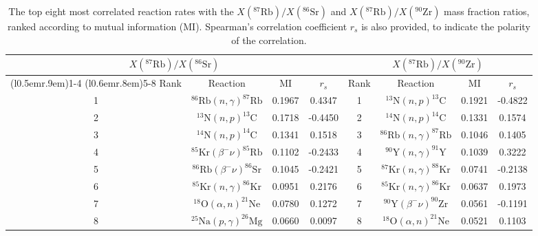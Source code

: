 \begin{table}[t]
\centering
\caption{\label{tab:mutual_info}The top eight most correlated reaction rates with the $X(^{87}\mathrm{Rb})/X(^{86}\mathrm{Sr})$ and $X(^{87}\mathrm{Rb})/X(^{90}\mathrm{Zr})$ mass fraction ratios, ranked according to mutual information (MI). Spearman's correlation coefficient $r_{s}$ is also provided, to indicate the polarity of the correlation.}
\begin{tabular}{cccc|cccc}
\hline\midrule
\multicolumn{4}{c}{$X(^{87}\mathrm{Rb})/X(^{86}\mathrm{Sr})$}&
\multicolumn{4}{c}{$X(^{87}\mathrm{Rb})/X(^{90}\mathrm{Zr})$}\\
\cmidrule[0.05pt](l{0.5em}r{.9em}){1-4} \cmidrule[0.1pt](l{0.6em}r{.8em}){5-8}
Rank&Reaction&MI&$r_{s}$&Rank&Reaction&MI&$r_{s}$\\ \midrule
1&$^{86}\mathrm{Rb}(n,\gamma)^{87}\mathrm{Rb}$&0.1967&0.4347
&1&$^{13}\mathrm{N}(n,p)^{13}\mathrm{C}$&0.1921&-0.4822\\
2&$^{13}\mathrm{N}(n,p)^{13}\mathrm{C}$&0.1718&-0.4450
&2&$^{14}\mathrm{N}(n,p)^{14}\mathrm{C}$&0.1331&0.1574\\
3&$^{14}\mathrm{N}(n,p)^{14}\mathrm{C}$&0.1341&0.1518
&3&$^{86}\mathrm{Rb}(n,\gamma)^{87}\mathrm{Rb}$&0.1046&0.1405\\
4&$^{85}\mathrm{Kr}(\beta^{-}\nu)^{85}\mathrm{Rb}$&0.1102&-0.2433
&4&$^{90}\mathrm{Y}(n,\gamma)^{91}\mathrm{Y}$&0.1039&0.3222\\
5&$^{86}\mathrm{Rb}(\beta^{-}\nu)^{86}\mathrm{Sr}$&0.1045&-0.2421
&5&$^{87}\mathrm{Kr}(n,\gamma)^{88}\mathrm{Kr}$&0.0741&-0.2138\\
6&$^{85}\mathrm{Kr}(n,\gamma)^{86}\mathrm{Kr}$&0.0951&0.2176
&6&$^{85}\mathrm{Kr}(n,\gamma)^{86}\mathrm{Kr}$&0.0637&0.1973\\
7&$^{18}\mathrm{O}(\alpha,n)^{21}\mathrm{Ne}$&0.0780&0.1272
&7&$^{90}\mathrm{Y}(\beta^{-}\nu)^{90}\mathrm{Zr}$&0.0561&-0.1191\\
8&$^{25}\mathrm{Na}(p,\gamma)^{26}\mathrm{Mg}$&0.0660&0.0097
&8&$^{18}\mathrm{O}(\alpha,n)^{21}\mathrm{Ne}$&0.0521&0.1103\\
\hline\hline
\end{tabular}
\end{table}


